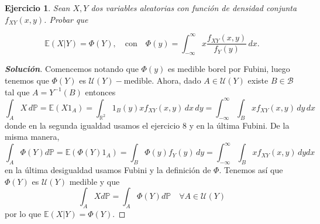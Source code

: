 \documentclass[11pt]{article}
\theoremstyle{ejstyle}
\newtheorem{ejercicio}{Ejercicio}
\newenvironment{solucion}
{\begin{proof}[{\bfseries\color{deepindigo} Solución}]}
	{\end{proof}}
\begin{document}
	\begin{ejercicio}
		Sean $X, Y$ dos variables aleatorias con función de densidad conjunta $f_{XY}(x,y)$. Probar que
		
		$$ \mathbb{E}(X|Y) = \Phi(Y), \quad \text{con} \quad \Phi(y) = \int_{-\infty}^{\infty} x \frac{f_{XY}(x,y)}{f_Y(y)} \, dx. $$
	\end{ejercicio}
	
	\begin{solucion}
		Comencemos notando que $\Phi(y)$ es medible borel por Fubini, luego tenemos que $\Phi(Y)$ es $\mathcal{U}(Y)-$medible. Ahora, dado $A \in \mathcal{U}(Y)$ existe $B \in \mathcal{B}$ tal que $A = Y^{-1}(B)$ entonces
		$$
		\int_{A} X \, d\mathbb{P} = \mathbb{E}(X1_{A}) =  \int_{\mathbb{R}^{2}} 1_{B}(y) x f_{XY}(x,y) \, dx \, dy = \int_{-\infty}^{\infty} \int_{B} x f_{XY}(x, y) \, dy \, dx
		$$
		donde en la segunda igualdad usamos el ejercicio 8 y en la última Fubini. De la misma manera,
		$$
		\int_{A} \Phi(Y) d\mathbb{P} = \mathbb{E}(\Phi(Y)1_{A}) = \int_{B} \Phi(y) f_{Y}(y) \, dy = \int_{-\infty}^{\infty} \int_{B} x f_{XY}(x, y) \, dy dx
 		$$
 		en la última desigualdad usamos Fubini y la definición de $\Phi$. Tenemos así que $\Phi(Y)$ es $\mathcal{U}(Y)$ medible y que
 		$$
 		\int_{A} X d\mathbb{P} = \int_{A} \Phi(Y) d\mathbb{P} \quad \forall A \in \mathcal{U}(Y) 
 		$$
 		por lo que $\mathbb{E}(X | Y) = \Phi(Y)$.
 		
	\end{solucion}
\end{document}

